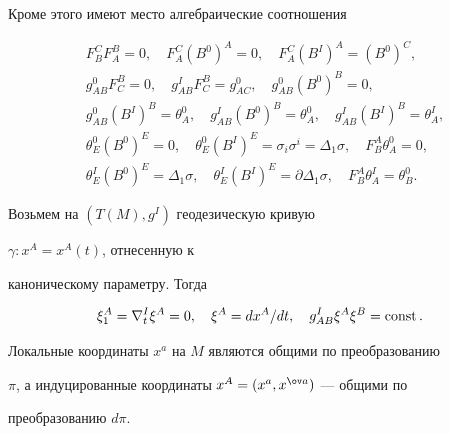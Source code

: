 Кроме этого имеют место алгебраические соотношения


\begin{equation}


\begin{split}


& F^C_B F^B_A=0,\quad F^C_A(B^0)^A=0,\quad


F^C_A(B^I)^A=(B^0)^C, \\


& g^0_{AB}F^B_C=0,\quad g^I_{AB}F^B_C=g^0_{AC},\quad


g^0_{AB}(B^0)^B=0, \\


& g^0_{AB}(B^I)^B=\theta^0_A,\quad


g^I_{AB}(B^0)^B=\theta^0_A,\quad


g^I_{AB}(B^I)^B=\theta^I_A, \\


& \theta^0_E(B^0)^E=0,\quad


\theta^0_E(B^I)^E=\sigma_i\sigma^i=\Delta_1\sigma,\quad


F^A_B\theta^0_A=0, \\


& \theta^I_E(B^0)^E=\Delta_1\sigma,\quad


\theta^I_E(B^I)^E=\partial\Delta_1\sigma,\quad


F^A_B\theta^I_A=\theta^0_B.


\end{split}


\end{equation}





Возьмем на $(T(M),g^I)$ геодезическую кривую


$\gamma:x^A=x^A(t)$, отнесенную к


каноническому параметру. Тогда


\begin{equation}


\xi^A_1=\nabla^I_t\xi^A=0,\quad


\xi^A=dx^A/dt,\quad


g^I_{AB}\xi^A\xi^B=\const.


\end{equation}


Локальные координаты $x^a$ на $M$ являются общими по преобразованию


$\pi$, а индуцированные координаты $x^A=(x^a,x^{\ov a})$ --- общими по


преобразованию $d\pi$.


